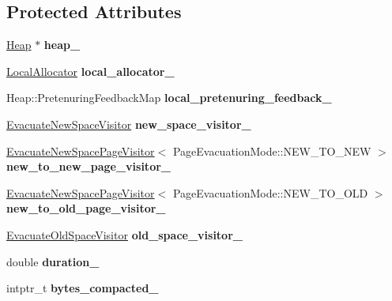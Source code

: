 \subsection*{Protected Attributes}
\begin{DoxyCompactItemize}
\item 
\mbox{\label{classv8_1_1internal_1_1Evacuator_ab742b02acfc2907cbcb8345cf302094c}} 
\mbox{\hyperlink{classv8_1_1internal_1_1Heap}{Heap}} $\ast$ {\bfseries heap\+\_\+}
\item 
\mbox{\label{classv8_1_1internal_1_1Evacuator_a639cae11545b70682943bb5768332f76}} 
\mbox{\hyperlink{classv8_1_1internal_1_1LocalAllocator}{Local\+Allocator}} {\bfseries local\+\_\+allocator\+\_\+}
\item 
\mbox{\label{classv8_1_1internal_1_1Evacuator_aca54279acf9425e4e3a69f368bb24023}} 
Heap\+::\+Pretenuring\+Feedback\+Map {\bfseries local\+\_\+pretenuring\+\_\+feedback\+\_\+}
\item 
\mbox{\label{classv8_1_1internal_1_1Evacuator_aaf0b310376fca6d434f0f86665f54cc3}} 
\mbox{\hyperlink{classv8_1_1internal_1_1EvacuateNewSpaceVisitor}{Evacuate\+New\+Space\+Visitor}} {\bfseries new\+\_\+space\+\_\+visitor\+\_\+}
\item 
\mbox{\label{classv8_1_1internal_1_1Evacuator_a938323a230a933782bb9f4eafbfcc76c}} 
\mbox{\hyperlink{classv8_1_1internal_1_1EvacuateNewSpacePageVisitor}{Evacuate\+New\+Space\+Page\+Visitor}}$<$ Page\+Evacuation\+Mode\+::\+N\+E\+W\+\_\+\+T\+O\+\_\+\+N\+EW $>$ {\bfseries new\+\_\+to\+\_\+new\+\_\+page\+\_\+visitor\+\_\+}
\item 
\mbox{\label{classv8_1_1internal_1_1Evacuator_a406eaf37c604a7e051cb57a3a7389576}} 
\mbox{\hyperlink{classv8_1_1internal_1_1EvacuateNewSpacePageVisitor}{Evacuate\+New\+Space\+Page\+Visitor}}$<$ Page\+Evacuation\+Mode\+::\+N\+E\+W\+\_\+\+T\+O\+\_\+\+O\+LD $>$ {\bfseries new\+\_\+to\+\_\+old\+\_\+page\+\_\+visitor\+\_\+}
\item 
\mbox{\label{classv8_1_1internal_1_1Evacuator_a637b8c1d84de69d52244d7936307cf39}} 
\mbox{\hyperlink{classv8_1_1internal_1_1EvacuateOldSpaceVisitor}{Evacuate\+Old\+Space\+Visitor}} {\bfseries old\+\_\+space\+\_\+visitor\+\_\+}
\item 
\mbox{\label{classv8_1_1internal_1_1Evacuator_a7e7e6db642a2a69847319b2b0107634d}} 
double {\bfseries duration\+\_\+}
\item 
\mbox{\label{classv8_1_1internal_1_1Evacuator_a8cd5f5f0a98465d866842dcff1c47f47}} 
intptr\+\_\+t {\bfseries bytes\+\_\+compacted\+\_\+}
\end{DoxyCompactItemize}
